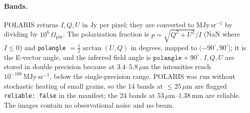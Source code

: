 \paragraph{Bands.} POLARIS returns $I,Q,U$ in Jy per pixel; they are converted to $\mathrm{MJy\,sr^{-1}}$ by
dividing by $10^{6}\,\Omega_\mathrm{pix}$. The polarization fraction is $p=\sqrt{Q^{2}+U^{2}}/I$ (NaN where
$I\le0$) and \texttt{polangle} $=\tfrac12\arctan(U,Q)$ in degrees, mapped to $(-90^\circ,90^\circ]$; it is the
E-vector angle, and the inferred field angle is $\texttt{polangle}+90^\circ$. $I,Q,U$ are stored in double
precision because at $3.4$--$5.8\,\mu\mathrm{m}$ the intensities reach $10^{-108}\,\mathrm{MJy\,sr^{-1}}$, below
the single-precision range. POLARIS was run without stochastic heating of small grains, so the 14 bands at
$\le25\,\mu\mathrm{m}$ are flagged \texttt{reliable: false} in the manifest; the 24 bands at
$53\,\mu\mathrm{m}$--$1.38\,\mathrm{mm}$ are reliable. The images contain no observational noise and no beam.

